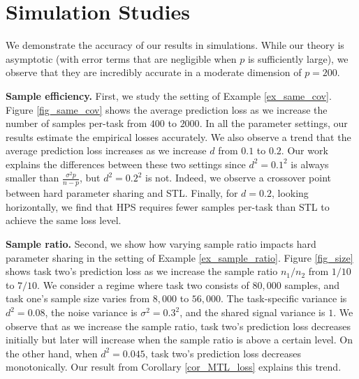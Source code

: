 \section{Simulation Studies}\label{sec_simulation}

We demonstrate the accuracy of our results in simulations.
While our theory is asymptotic (with error terms that are negligible when $p$ is sufficiently large), we observe that they are incredibly accurate in a moderate dimension of $p = 200$.

\textbf{Sample efficiency.}
First, we study the setting of Example \ref{ex_same_cov}.
Figure \ref{fig_same_cov} shows the average prediction loss as we increase the number of samples per-task   from $400$ to $2000$.
In all the parameter settings, our results estimate the empirical losses accurately.
We also observe a trend that the average prediction loss increases as we increase $d$ from $0.1$ to $0.2$.
Our work explains the differences between these two settings since $d^2 = 0.1^2$ is always smaller than $\frac{\sigma^2 p}{n - p}$, but $d^2 = 0.2^2$ is not.
Indeed, we observe a crossover point between hard parameter sharing and STL.
Finally, for $d = 0.2$, looking horizontally, we find that HPS requires fewer samples per-task than STL to achieve the same loss level. %

\textbf{Sample ratio.}
Second, we show how varying sample ratio impacts hard parameter sharing in the setting of Example \ref{ex_sample_ratio}.
Figure \ref{fig_size} shows task two's prediction loss as we increase the sample ratio $n_1 / n_2$ from $1/10$ to $7/10$.
We consider a regime where task two consists of $80,000$ samples, and task one's sample size varies from $8,000$ to $56,000$. 
The task-specific variance is $d^2 = 0.08$, the noise variance is $\sigma^2 = 0.3^2$, and the shared signal variance is $1$. We observe that as we increase the sample ratio, task two's prediction loss decreases initially but later will increase when the sample ratio is above a certain level.
On the other hand, when $d^2 = 0.045$, task two's prediction loss decreases monotonically.
Our result from Corollary \ref{cor_MTL_loss} explains this trend. 

